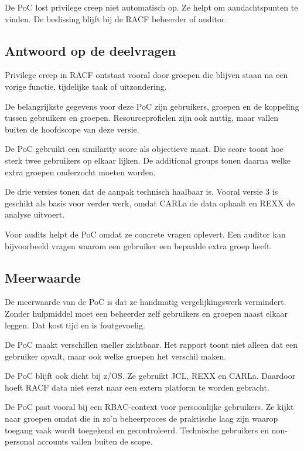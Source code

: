 De PoC lost privilege creep niet automatisch op. Ze helpt om aandachtspunten te vinden. De beslissing blijft bij de RACF beheerder of auditor.

\subsection*{Antwoord op de deelvragen}

Privilege creep in RACF ontstaat vooral door groepen die blijven staan na een vorige functie, tijdelijke taak of uitzondering.

De belangrijkste gegevens voor deze PoC zijn gebruikers, groepen en de koppeling tussen gebruikers en groepen. Resourceprofielen zijn ook nuttig, maar vallen buiten de hoofdscope van deze versie.

De PoC gebruikt een similarity score als objectieve maat. Die score toont hoe sterk twee gebruikers op elkaar lijken. De additional groups tonen daarna welke extra groepen onderzocht moeten worden.

De drie versies tonen dat de aanpak technisch haalbaar is. Vooral versie 3 is geschikt als basis voor verder werk, omdat CARLa de data ophaalt en REXX de analyse uitvoert.

Voor audits helpt de PoC omdat ze concrete vragen oplevert. Een auditor kan bijvoorbeeld vragen waarom een gebruiker een bepaalde extra groep heeft.

\subsection*{Meerwaarde}

De meerwaarde van de PoC is dat ze handmatig vergelijkingswerk vermindert. Zonder hulpmiddel moet een beheerder zelf gebruikers en groepen naast elkaar leggen. Dat kost tijd en is foutgevoelig.

De PoC maakt verschillen sneller zichtbaar. Het rapport toont niet alleen dat een gebruiker opvalt, maar ook welke groepen het verschil maken.

De PoC blijft ook dicht bij z/OS. Ze gebruikt JCL, REXX en CARLa. Daardoor hoeft RACF data niet eerst naar een extern platform te worden gebracht.

De PoC past vooral bij een RBAC-context voor persoonlijke gebruikers. Ze kijkt naar groepen omdat die in zo'n beheerproces de praktische laag zijn waarop toegang vaak wordt toegekend en gecontroleerd. Technische gebruikers en non-personal accounts vallen buiten de scope.

